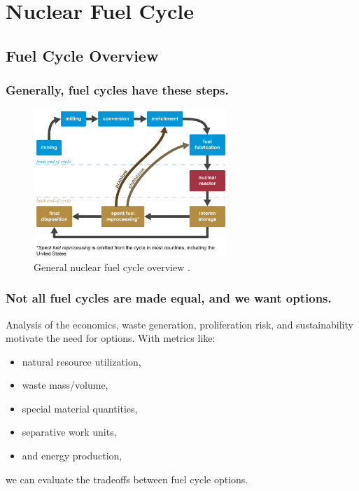 \documentclass[9pt]{beamer}
\begin{document}
\section{Nuclear Fuel Cycle}
\subsection{Fuel Cycle Overview}

  \begin{frame}
      \frametitle{Generally, fuel cycles have these steps.}
      \begin{figure}[ht!]
      \centering
      \includegraphics[width=0.65\textwidth]{images/nuclear_fuel_cycle.png}
      \caption{General nuclear fuel cycle overview \cite{penn_fc}.}
      \end{figure}
  \end{frame}

  \begin{frame}
      \frametitle{Not all fuel cycles are made equal, and we want options.}
      Analysis of the economics, waste generation, proliferation risk, and sustainability motivate the need for options. With metrics like:
        \begin{itemize}%
            \item natural resource utilization, %
            \item waste mass/volume,
            \item special material quantities,
            \item separative work units,
            \item and energy production,
        \end{itemize}
        we can evaluate the tradeoffs between fuel cycle options.
  \end{frame}
\end{document}
